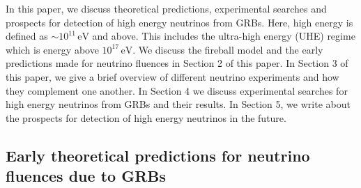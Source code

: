\documentclass[12pt]{article}
\begin{document}
\begin{doublespace}
In this paper, we discuss theoretical predictions, experimental searches and prospects for detection of high energy neutrinos from GRBs. Here, high energy is defined as $\sim 10^{11} \, \mathrm{eV}$ and above. This includes the ultra-high energy (UHE) regime which is energy above $10^{17} \, \mathrm{eV}$. We discuss the fireball model and the early predictions made for neutrino fluences in Section 2 of this paper. In Section 3 of this paper, we give a brief overview of different neutrino experiments and how they complement one another. In Section 4 we discuss experimental searches for high energy neutrinos from GRBs and their results. In Section 5, we write about the prospects for detection of high energy neutrinos in the future.


\begin{singlespace}
\section{Early theoretical predictions for neutrino fluences due to GRBs}
\end{singlespace}


\end{doublespace}
\end{document}
